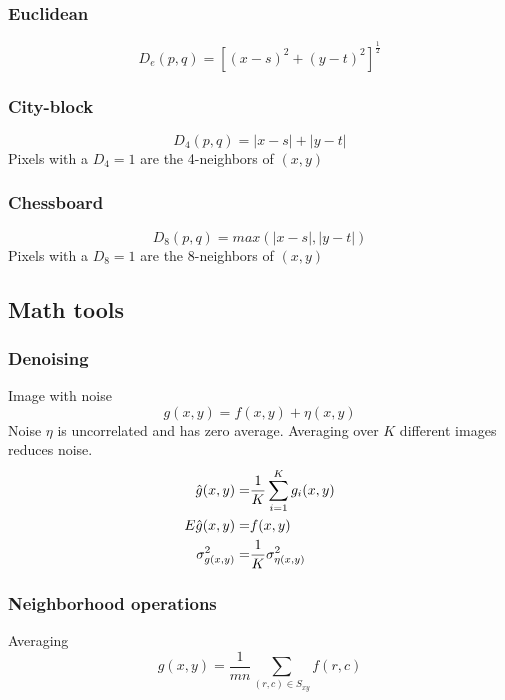 \subsubsection{Euclidean}
\begin{equation}
D_e(p,q) = [(x-s)^2 + (y-t)^2]^{\frac{1}{2}}
\end{equation}
\subsubsection{City-block}
\begin{equation}
D_4(p,q) = |x-s| + |y-t|
\end{equation}
Pixels with a $D_4 = 1$ are the 4-neighbors of $(x,y)$
\subsubsection{Chessboard}
\begin{equation}
D_8(p,q) = max(|x-s|, |y-t|)
\end{equation}
Pixels with a $D_8 = 1$ are the 8-neighbors of $(x,y)$


\subsection{Math tools}
\subsubsection{Denoising}
Image with noise
\begin{equation}
g(x,y) = f(x,y) + \eta(x,y)
\end{equation}
Noise $\eta$ is uncorrelated and has zero average.  Averaging over $K$ different images reduces noise.
\begin{eqnarray}
\hat{g}(x,y)      =& \frac{1}{K} \sum_{i=1}^{K}g_i(x,y) \notag \\
E{\hat{g}(x,y)}   =& f(x,y) \\
\sigma_{g(x,y)}^2 =& \frac{1}{K} \sigma_{\eta(x,y)}^2 \notag
\end{eqnarray}

\subsubsection{Neighborhood operations}
Averaging
\begin{equation}
g(x,y) = \frac{1}{mn} \sum_{(r,c)\in S_{xy}}f(r,c)
\end{equation}

